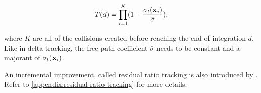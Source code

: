 \begin{equation}
    T(d) = \prod_{i=1}^K (1 - \frac{\sigma_t(\textbf{x}_i)}{\bar\sigma}),
\end{equation}

where $K$ are all of the collisions created before reaching the end of integration $d$. Like in delta tracking, the free path coefficient $\bar\sigma$ needs to be constant and a majorant of $\sigma_t(\textbf{x}_i)$.

An incremental improvement, called residual ratio tracking is also introduced by \cite{novak2014residual}. Refer to \ref{appendix:residual-ratio-tracking} for more details.